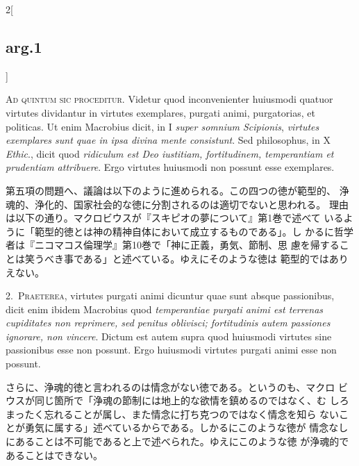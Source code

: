 \documentclass[paper=a4paper,fontsize=10pt,jafontsize=9pt,titlepage]{jlreq}
\begin{document}
\begin{paracol}{2}[\subsection{arg.1}]

{\scshape Ad quintum sic proceditur}. Videtur quod inconvenienter
huiusmodi quatuor virtutes dividantur in virtutes exemplares, purgati
animi, purgatorias, et politicas. Ut enim Macrobius dicit, in I
{\itshape super somnium Scipionis}, {\itshape virtutes exemplares sunt
quae in ipsa divina mente consistunt}. Sed philosophus, in X {\itshape
Ethic}., dicit quod {\itshape ridiculum est Deo iustitiam,
fortitudinem, temperantiam et prudentiam attribuere}. Ergo virtutes
huiusmodi non possunt esse exemplares.

\switchcolumn

第五項の問題へ、議論は以下のように進められる。この四つの徳が範型的、
 浄魂的、浄化的、国家社会的な徳に分割されるのは適切でないと思われる。
 理由は以下の通り。マクロビウスが『スキピオの夢について』第1巻で述べて
 いるように「範型的徳とは神の精神自体において成立するものである」。し
 かるに哲学者は『ニコマコス倫理学』第10巻で「神に正義，勇気、節制、思
 慮を帰することは笑うべき事である」と述べている。ゆえにそのような徳は
 範型的ではありえない。


2.~{\scshape Praeterea}, virtutes purgati animi dicuntur quae sunt
absque passionibus, dicit enim ibidem Macrobius quod {\itshape
temperantiae purgati animi est terrenas cupiditates non reprimere, sed
penitus oblivisci; fortitudinis autem passiones ignorare, non
vincere}. Dictum est autem supra quod huiusmodi virtutes sine
passionibus esse non possunt. Ergo huiusmodi virtutes purgati animi
esse non possunt.

\switchcolumn

さらに、浄魂的徳と言われるのは情念がない徳である。というのも、マクロ
 ビウスが同じ箇所で「浄魂の節制には地上的な欲情を鎮めるのではなく、む
 しろまったく忘れることが属し、また情念に打ち克つのではなく情念を知ら
 ないことが勇気に属する」述べているからである。しかるにこのような徳が
 情念なしにあることは不可能であると上で述べられた。ゆえにこのような徳
 が浄魂的であることはできない。



\end{paracol}
\end{document}
